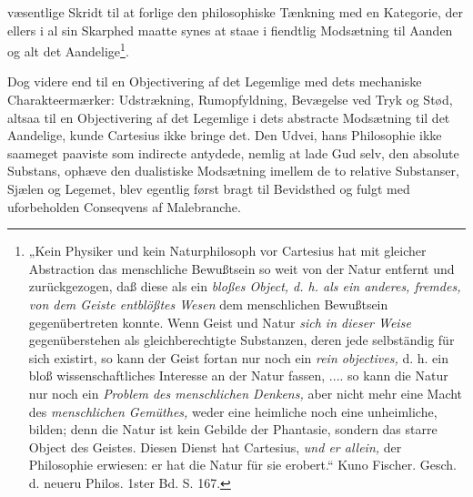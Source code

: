 \documentclass[12pt,a4paper]{book}
\begin{document}
\setcounter{footnote}{0}
væsentlige Skridt til at forlige den philosophiske Tænkning med en Kategorie, der
ellers i al sin Skarphed maatte synes at staae i fiendtlig Modsætning til Aanden
og alt det Aandelige\footnote{„Kein Physiker und kein Naturphilosoph vor
Cartesius hat mit gleicher Abstraction das menschliche Bewußtsein so weit von der
Natur entfernt und zurückgezogen, daß diese als ein \emph{bloßes Object, d. h.
als ein anderes, fremdes, von dem Geiste entblößtes Wesen} dem menschlichen
Bewußtsein gegenübertreten konnte. Wenn Geist und Natur \emph{sich in dieser
Weise} gegenüberstehen als gleichberechtigte Substanzen, deren jede selbständig
für sich existirt, so kann der Geist fortan nur noch ein \emph{rein objectives,}
d. h. ein bloß wissenschaftliches Interesse an der Natur fassen, .... so kann die
Natur nur noch ein \emph{Problem des menschlichen Denkens,} aber nicht mehr eine
Macht des \emph{menschlichen Gemüthes,} weder eine heimliche noch eine
unheimliche, bilden; denn die Natur ist kein Gebilde der Phantasie, sondern das
starre Object des Geistes. Diesen Dienst hat Cartesius, \emph{und er allein,} der
Philosophie erwiesen: er hat die Natur für sie erobert.“ Kuno Fischer. Gesch. d.
neueru Philos. 1ster Bd. S. 167.}.

Dog videre end til en Objectivering af det Legemlige med dets mechaniske
Charakteermærker: Udstrækning, Rumopfyldning, Bevægelse ved Tryk og Stød, altsaa
til en Objectivering af det Legemlige i dets abstracte Modsætning til det
Aandelige, kunde Cartesius ikke bringe det. Den Udvei, hans Philosophie ikke
saameget paaviste som indirecte antydede, nemlig at lade Gud selv, den absolute
Substans, ophæve den dualistiske Modsætning imellem de to relative Substanser,
Sjælen og Legemet, blev egentlig først bragt til Bevidsthed og fulgt med
uforbeholden Conseqvens af Malebranche.
\end{document}
